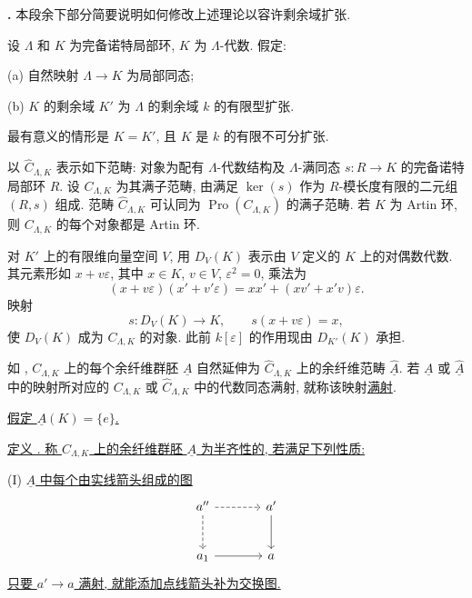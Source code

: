 

\textbf{.}
本段余下部分简要说明如何修改上述理论以容许剩余域扩张.

设 $\Lambda$ 和 $K$ 为完备诺特局部环, $K$ 为 $\Lambda$-代数. 假定:

(a) 自然映射 $\Lambda\longrightarrow K$ 为局部同态;

(b) $K$ 的剩余域 $K'$ 为 $\Lambda$ 的剩余域 $k$ 的有限型扩张.

最有意义的情形是 $K=K'$, 且 $K$ 是 $k$ 的有限不可分扩张.

以 $\widehat C_{\Lambda,K}$ 表示如下范畴: 对象为配有
$\Lambda$-代数结构及 $\Lambda$-满同态 $s:R\longrightarrow K$
的完备诺特局部环 $R$. 设 $C_{\Lambda,K}$ 为其满子范畴,
由满足 $\ker(s)$ 作为 $R$-模长度有限的二元组 $(R,s)$ 组成.
范畴 $\widehat C_{\Lambda,K}$ 可认同为
$\operatorname{Pro}(C_{\Lambda,K})$ 的满子范畴.
若 $K$ 为 Artin 环, 则 $C_{\Lambda,K}$ 的每个对象都是 Artin 环.

对 $K'$ 上的有限维向量空间 $V$, 用 $D_V(K)$
表示由 $V$ 定义的 $K$ 上的对偶数代数.
其元素形如 $x+v\varepsilon$, 其中 $x\in K$, $v\in V$, $\varepsilon^2=0$,
乘法为
\[
 (x+v\varepsilon)(x'+v'\varepsilon)
 =xx'+(xv'+x'v)\varepsilon.
\]
映射
\[
 s:D_V(K)\longrightarrow K,
 \qquad s(x+v\varepsilon)=x,
\]
使 $D_V(K)$ 成为 $C_{\Lambda,K}$ 的对象.
此前 $k[\varepsilon]$ 的作用现由 $D_{K'}(K)$ 承担.

如 , $C_{\Lambda,K}$ 上的每个余纤维群胚
$\underline A$ 自然延伸为 $\widehat C_{\Lambda,K}$ 上的余纤维范畴
$\widehat{\underline A}$. 若 $\underline A$ 或 $\widehat{\underline A}$
中的映射所对应的 $C_{\Lambda,K}$ 或 $\widehat C_{\Lambda,K}$
中的代数同态满射, 就称该映射\underline{满射}.


\underline{假定 $\underline A(K)=\{e\}$.}

\underline{定义 .
称 $C_{\Lambda,K}$ 上的余纤维群胚 $\underline A$ 为半齐性的, 若满足下列性质:}

(I) \underline{$\underline A$ 中每个由实线箭头组成的图}
\[
\begin{tikzcd}[row sep=large,column sep=large]
a'' \arrow[r,dashed] \arrow[d,dashed]
 & a' \arrow[d] \\
a_1 \arrow[r] & a
\end{tikzcd}
\]
\underline{只要 $a'\longrightarrow a$ 满射, 就能添加点线箭头补为交换图.}

